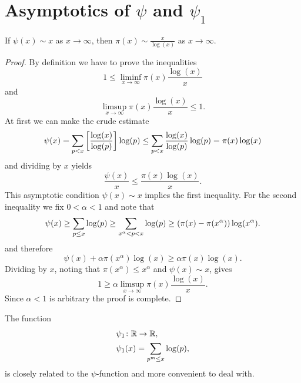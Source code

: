 \section{Asymptotics of $\psi$ and $\psi_1$}


\begin{lemma}
	If $\psi(x) \sim x$ as $x \to \infty$, then $\pi(x) \sim \frac{x}{\log(x)}$ as $x \to \infty$.
\end{lemma}
\begin{proof}
	By definition we have to prove the inequalities
\begin{equation*}
	1 \leq \liminf _{x \to \infty} \pi(x) \frac{\log(x)}{x}
\end{equation*}
	and
\begin{equation*}
	\limsup _{x \to \infty} \pi(x) \frac{\log(x)}{x} \leq 1.
\end{equation*}
	At first we can make the crude estimate
\begin{equation*}
	\psi(x) = \sum _{p < x} \left[\frac{\log(x)}{\log(p)}\right] \log(p) \leq \sum _{p < x} \frac{\log(x)}{\log(p)} \log(p) = \pi(x) \log(x)
\end{equation*}
	and dividing by $x$ yields
\begin{equation*}
	\frac{\psi(x)}{x} \leq \frac{\pi(x) \log(x)}{x}.
\end{equation*}
	This asymptotic condition $\psi(x) \sim x$ implies the first inequality. For the second inequality we fix $0 < \alpha < 1$ and note that
\begin{equation*}
	\psi(x) \geq \sum _{p \leq x} \log(p) \geq \sum _{x^\alpha < p < x} \log(p) \geq \left(\pi(x) - \pi(x^\alpha)\right) \log(x^\alpha).
\end{equation*}
	and therefore
\begin{equation*}
	\psi(x) + \alpha \pi(x^\alpha) \log(x) \geq \alpha \pi(x) \log(x).
\end{equation*}
	Dividing by $x$, noting that $\pi(x^\alpha) \leq x^\alpha$ and $\psi(x) \sim x$, gives
\begin{equation*}
	1 \geq \alpha \limsup _{x \to \infty} \pi(x) \frac{\log(x)}{x}.
\end{equation*}
	Since $\alpha < 1$ is arbitrary the proof is complete.
\end{proof}


\begin{definition}
	The function
\begin{equation*}
\begin{aligned}
	&\psi_1 \colon \mathbb{R} \to \mathbb{R}, \\
	&\psi_1(x) = \sum _{p^m \leq x} \log(p),
\end{aligned}
\end{equation*}
	is closely related to the $\psi$-function and more convenient to deal with.
\end{definition}



